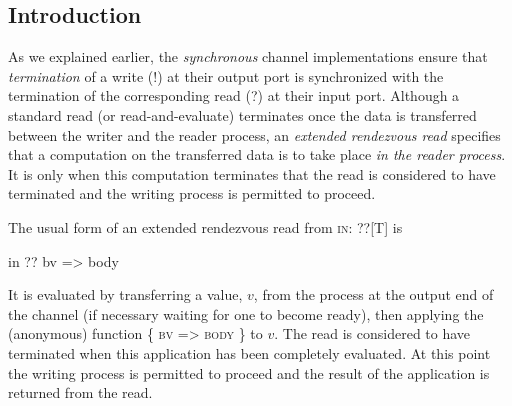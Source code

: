 \documentclass[12pt]{IOS-Book-Article-CPA-2017}
\begin{document}
\subsection{Introduction}
As we explained earlier, the \textit{synchronous} channel implementations 
ensure that \textit{termination} of a write (!) at their output port is
synchronized with the termination of the corresponding read (?) at
their input port. 
%
Although a standard read (or read-and-evaluate) terminates once the data is transferred
between the writer and the reader process, an \textit{extended
rendezvous read} specifies that a computation on the transferred data is to take place \textit{in the
reader process}. It is only when this computation terminates
that the read is considered to have terminated and the writing process
is permitted to proceed.

The usual form of an extended rendezvous read from \textsc{in: ??[T]} is
\begin{code}
        in ?? { bv => body } 
\end{code}
It is evaluated by transferring a value, $v$, from the process at
the output end of the channel (if necessary waiting for one to
become ready), then applying the (anonymous) function \textsc{\{ bv => body \}}
to $v$. The read is considered to have terminated when
this application has been completely evaluated. At this point the writing process 
is permitted to proceed and the result of the application is returned from the read. 


\begin{comment}
In CSO the notation for an extended rendezvous read from \textsc{in: ??[T]} is
\textsc{in ? f}, where \textsc{f: T=>U} denotes function of type \textsc{T=>U}. 
The expression \textsc{in ? f} has type \textsc{U}, and it is evaluated by 
transferring a value, $v$, from the process at the output end of the
channel (if necessary waiting for one to become ready), then evaluating \textsc{f}($v$).
The read is considered to have terminated when the evaluation of \textsc{f}($v$)
is complete;  at which point the writing process proceeds.
It is more readable to express the function
anonymously than to name it; \textit{i.e.} to express the whole rendezvous in the form 
\textsc{in ? \{v => body\}} rather than in the form \textsc{\{def f(v)=body; in ? f\}}.
\end{comment}
\end{document}
